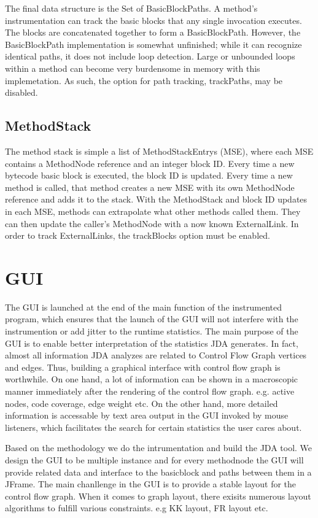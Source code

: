 \documentclass[conference,10pt,twocolumn]{./IEEE/IEEEtran}
\begin{document}
The final data structure is the Set of BasicBlockPaths.
A method’s instrumentation can track the basic blocks that any single invocation executes.
The blocks are concatenated together to form a BasicBlockPath.
However, the BasicBlockPath implementation is somewhat unfinished; while it can recognize identical paths, it does not include loop detection.
Large or unbounded loops within a method can become very burdensome in memory with this implemetation.
As such, the option for path tracking, trackPaths, may be disabled.

\subsection{MethodStack}
The method stack is simple a list of MethodStackEntrys (MSE), where each MSE contains a MethodNode reference and an integer block ID.  
Every time a new bytecode basic block is executed, the block ID is updated.  
Every time a new method is called, that method creates a new MSE with its own MethodNode reference and adds it to the stack.  
With the MethodStack and block ID updates in each MSE, methods can extrapolate what other methods called them.  
They can then update the caller’s MethodNode with a now known ExternalLink.  
In order to track ExternalLinks, the trackBlocks option must be enabled.

\section{GUI}
The GUI is launched at the end of the main function of the instrumented program, which ensures that the launch of the GUI will not interfere with the instrumention or add jitter to the runtime statistics. The main purpose of the GUI is to enable better interpretation of the statistics JDA generates. In fact, almost all information JDA analyzes are related to Control Flow Graph vertices and edges. Thus, building a graphical interface with control flow graph is worthwhile. On one hand, a lot of information can be shown in a macroscopic manner immediately after the rendering of the control flow graph. e.g. active nodes, code coverage, edge weight etc. On the other hand, more detailed information is accessable by text area output in the GUI invoked by mouse listeners, which facilitates the search for certain statistics the user cares about.

Based on the methodology we do the intrumentation and build the JDA tool. We design the GUI to be multiple instance and for every methodnode the GUI will provide related data and interface to the basicblock and paths between them in a JFrame. The main chanllenge in the GUI is to provide a stable layout for the control flow graph. When it comes to graph layout, there exisits numerous layout algorithms to fulfill various constraints. e.g KK layout, FR layout etc.
\end{document}
